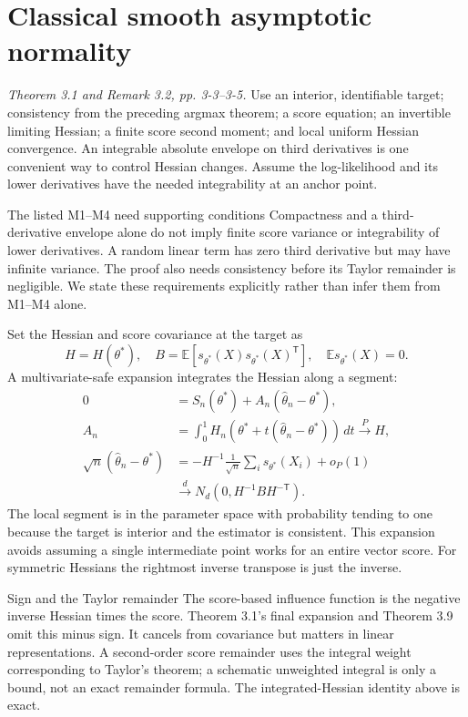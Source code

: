 \documentclass[12pt]{article}
\newcommand{\E}{\mathbb E}
\begin{document}
\section{Classical smooth asymptotic normality}
\textit{Theorem 3.1 and Remark 3.2, pp. 3-3--3-5.}
Use an interior, identifiable target; consistency from the preceding
argmax theorem; a score equation; an invertible limiting Hessian; a finite
score second moment; and local uniform Hessian convergence. An integrable
absolute envelope on third derivatives is one convenient way to control
Hessian changes. Assume the log-likelihood and its lower derivatives have
the needed integrability at an anchor point.
\begin{correctionbox}{The listed M1--M4 need supporting conditions}
Compactness and a third-derivative envelope alone do not imply finite score
variance or integrability of lower derivatives. A random linear term has
zero third derivative but may have infinite variance. The proof also needs
consistency before its Taylor remainder is negligible. We state these
requirements explicitly rather than infer them from M1--M4 alone.
\end{correctionbox}
Set the Hessian and score covariance at the target as
\begin{equation}
 H=H(\theta^*),\quad B=\E[s_{\theta^*}(X)s_{\theta^*}(X)^{\mathsf T}],
 \quad\E s_{\theta^*}(X)=0.
\end{equation}
A multivariate-safe expansion integrates the Hessian along a segment:
\begin{align}
 0&=S_n(\theta^*)+A_n(\widehat\theta_n-\theta^*),\\
 A_n&=\int_0^1H_n(\theta^*+t(\widehat\theta_n-\theta^*))\,dt
 \xrightarrow{P}H,\\
 \sqrt n(\widehat\theta_n-\theta^*)
 &=-H^{-1}\frac1{\sqrt n}\sum_i s_{\theta^*}(X_i)+o_P(1)\\
 &\xrightarrow{d}N_d(0,H^{-1}BH^{-\mathsf T}).
\end{align}
The local segment is in the parameter space with probability tending to
one because the target is interior and the estimator is consistent.
This expansion avoids assuming a single intermediate point works for an
entire vector score. For symmetric Hessians the rightmost inverse transpose
is just the inverse.
\begin{correctionbox}{Sign and the Taylor remainder}
The score-based influence function is the negative inverse Hessian times
the score. Theorem 3.1's final expansion and Theorem 3.9 omit this minus
sign. It cancels from covariance but matters in linear representations.
A second-order score remainder uses the integral weight corresponding to
Taylor's theorem; a schematic unweighted integral is only a bound, not an
exact remainder formula. The integrated-Hessian identity above is exact.
\end{correctionbox}
\end{document}
